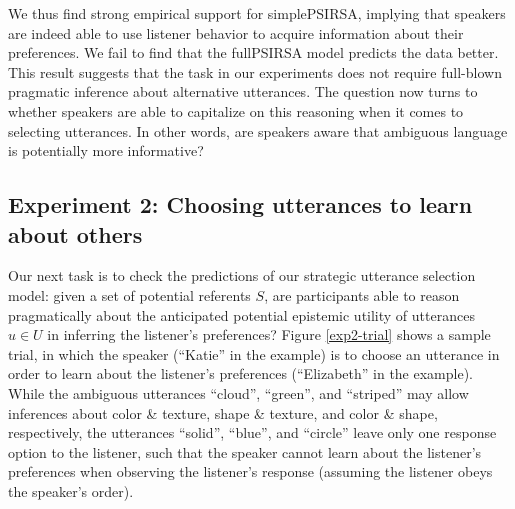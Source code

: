 \documentclass[10pt,a4paper]{article}
\begin{document}
We thus find strong empirical support for simplePSIRSA, implying that speakers are indeed able to use listener behavior to acquire information about their preferences. We fail to find that the fullPSIRSA model predicts the data better.
This result suggests that the task in our experiments does not require full-blown pragmatic inference about alternative utterances.
The question now turns to whether speakers are able to capitalize on this reasoning when it comes to selecting utterances. In other words, are speakers aware that ambiguous language is potentially more informative?





\subsection*{Experiment 2: Choosing utterances to learn about others}

Our next task is to check the predictions of our strategic utterance selection model: given a set of potential referents $S$, are participants able to reason pragmatically about the anticipated potential epistemic utility of utterances $u\in U$ in inferring the listener's preferences? Figure \ref{exp2-trial} shows a sample trial, in which the speaker (``Katie'' in the example) is to choose an utterance in order to learn about the listener's preferences (``Elizabeth'' in the example). While the ambiguous utterances ``cloud'', ``green'', and ``striped'' may allow inferences about color \& texture, shape \& texture, and color \& shape, respectively, the utterances ``solid'', ``blue'', and ``circle'' leave only one response option to the listener, such that the speaker cannot learn about the listener's preferences when observing the listener's response (assuming the listener obeys the speaker's order).  
\end{document}
